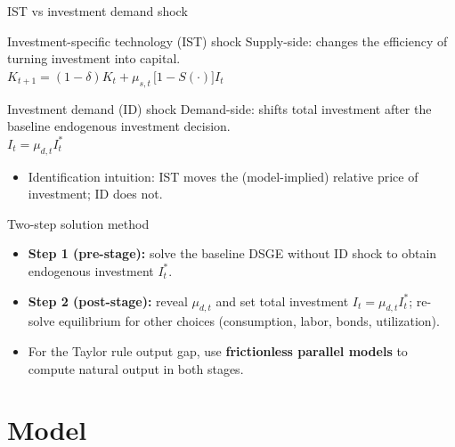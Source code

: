 \documentclass[10pt]{beamer}
\begin{document}
\begin{frame}{IST vs investment demand shock}
	\begin{block}{Investment-specific technology (IST) shock}
		Supply-side: changes the efficiency of turning investment into capital.
		\\[0.25em]
		\centering
		$K_{t+1} = (1-\delta)K_t + \mu_{s,t}\,\big[1-S(\cdot)\big] I_t$
	\end{block}

	\vspace{0.4em}
	\begin{block}{Investment demand (ID) shock}
		Demand-side: shifts total investment after the baseline endogenous investment decision.
		\\[0.25em]
		\centering
		$I_t = \mu_{d,t} I_t^{*}$
	\end{block}

	\vspace{0.4em}
	\begin{itemize}
		\item Identification intuition: IST moves the (model-implied) relative price of investment; ID does not.
	\end{itemize}
\end{frame}

\begin{frame}{Two-step solution method}
	\begin{itemize}
		\item \textbf{Step 1 (pre-stage):} solve the baseline DSGE without ID shock to obtain endogenous investment $I_t^{*}$.
		\item \textbf{Step 2 (post-stage):} reveal $\mu_{d,t}$ and set total investment $I_t = \mu_{d,t} I_t^{*}$; re-solve equilibrium for other choices (consumption, labor, bonds, utilization).
		\item For the Taylor rule output gap, use \textbf{frictionless parallel models} to compute natural output in both stages.
	\end{itemize}

	\vspace{0.1em}
	\centering
	\resizebox{0.78\textwidth}{!}{}
\end{frame}

\section{Model}
\end{document}
